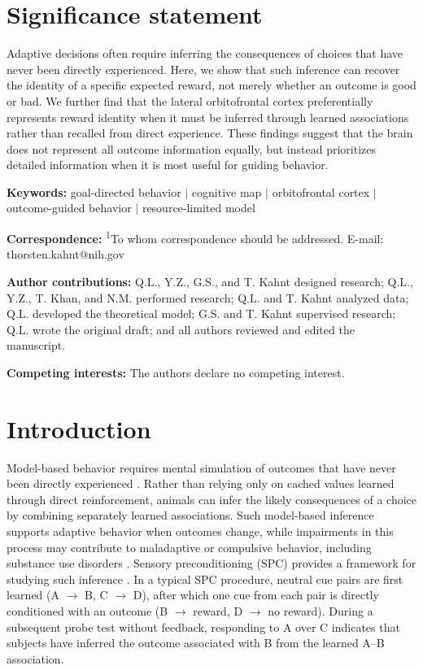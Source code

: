 \documentclass[12pt,letterpaper]{article}
\begin{document}
\section*{Significance statement}
Adaptive decisions often require inferring the consequences of choices that have never been directly experienced. Here, we show that such inference can recover the identity of a specific expected reward, not merely whether an outcome is good or bad. We further find that the lateral orbitofrontal cortex preferentially represents reward identity when it must be inferred through learned associations rather than recalled from direct experience. These findings suggest that the brain does not represent all outcome information equally, but instead prioritizes detailed information when it is most useful for guiding behavior.


\noindent\textbf{Keywords:} goal-directed behavior $|$ cognitive map $|$ orbitofrontal cortex $|$ outcome-guided behavior $|$ resource-limited model


\noindent\textbf{Correspondence:} \textsuperscript{1}To whom correspondence should be addressed. E-mail: thorsten.kahnt@nih.gov


\noindent\textbf{Author contributions:} Q.L., Y.Z., G.S., and T. Kahnt designed research; Q.L., Y.Z., T. Khan, and N.M. performed research; Q.L. and T. Kahnt analyzed data; Q.L. developed the theoretical model; G.S. and T. Kahnt supervised research; Q.L. wrote the original draft; and all authors reviewed and edited the manuscript.


\noindent\textbf{Competing interests:} The authors declare no competing interest.

\section*{Introduction}

Model-based behavior requires mental simulation of outcomes that have never been
directly experienced \cite{daw2011model,doll2015model,wangkahnt21}. Rather than relying only on cached values learned through direct reinforcement, animals can infer the likely consequences of a choice by combining separately learned associations. Such model-based inference supports adaptive behavior when outcomes change, while impairments in this process may contribute to maladaptive or compulsive behavior, including substance use disorders \cite{kahsch21,kahnt2023computationally}. Sensory preconditioning (SPC) provides a framework for studying such inference \cite{kahnt2023computationally,jones12,wang2020interactions}. In a typical SPC procedure, neutral cue pairs are first learned (A $\rightarrow$ B, C $\rightarrow$ D), after which one cue from each pair is directly conditioned with an outcome (B $\rightarrow$ reward, D $\rightarrow$ no reward). During a subsequent probe test without feedback, responding to A over C indicates that subjects have inferred the outcome associated with B from the learned A--B association.
\end{document}
